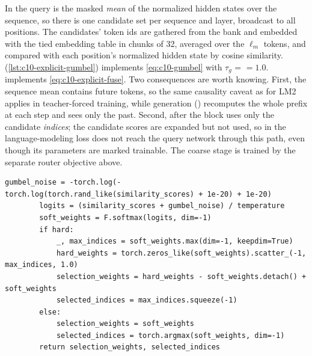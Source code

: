 \begin{implnote}[title={In the code: stage 2, fusion and gradients}]
In  the query is the masked \emph{mean} of the normalized hidden
states over the sequence, so there is one candidate set per sequence and layer, broadcast to all
positions. The candidates' token ids are gathered from the bank and embedded with the tied
embedding table in chunks of 32, averaged over the $\ell_m$ tokens, and compared with each
position's normalized hidden state by cosine similarity. 
(\cref{lst:c10-explicit-gumbel}) implements \cref{eq:c10-gumbel} with $\tau_g$ =
 $= 1.0$.  implements \cref{eq:c10-explicit-fuse}.
Two consequences are worth knowing. First, the sequence mean contains future tokens, so the same
causality caveat as for LM2 applies in teacher-forced training, while generation ()
recomputes the whole prefix at each step and sees only the past. Second, after
 the block uses only the candidate \emph{indices}; the candidate scores
are expanded but not used, so in  the language-modeling loss does not reach
the query network through this path, even though its parameters are marked trainable. The coarse
stage is trained by the separate router objective above.
\end{implnote}

\begin{lstlisting}[caption={Excerpt from \texttt{repos/SCUT-HCC\_\_ExplicitLM/models/core/Qwen3ExplicitLMBlock.py} (body of \texttt{gumbel\_softmax\_selection}).},label={lst:c10-explicit-gumbel}]
        gumbel_noise = -torch.log(-torch.log(torch.rand_like(similarity_scores) + 1e-20) + 1e-20)
        logits = (similarity_scores + gumbel_noise) / temperature
        soft_weights = F.softmax(logits, dim=-1)
        if hard:
            _, max_indices = soft_weights.max(dim=-1, keepdim=True)
            hard_weights = torch.zeros_like(soft_weights).scatter_(-1, max_indices, 1.0)
            selection_weights = hard_weights - soft_weights.detach() + soft_weights
            selected_indices = max_indices.squeeze(-1)
        else:
            selection_weights = soft_weights
            selected_indices = torch.argmax(soft_weights, dim=-1)
        return selection_weights, selected_indices
\end{lstlisting}

